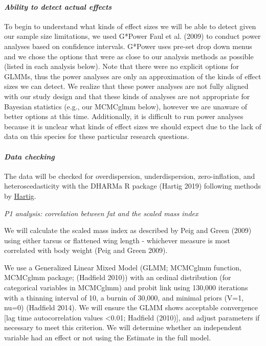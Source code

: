 \documentclass[
]{article}
\begin{document}
\hypertarget{ability-to-detect-actual-effects}{%
\paragraph{\texorpdfstring{\emph{Ability to detect actual
effects}}{Ability to detect actual effects}}\label{ability-to-detect-actual-effects}}

To begin to understand what kinds of effect sizes we will be able to
detect given our sample size limitations, we used G*Power Faul et al.
(2009) to conduct power analyses based on confidence intervals. G*Power
uses pre-set drop down menus and we chose the options that were as close
to our analysis methods as possible (listed in each analysis below).
Note that there were no explicit options for GLMMs, thus the power
analyses are only an approximation of the kinds of effect sizes we can
detect. We realize that these power analyses are not fully aligned with
our study design and that these kinds of analyses are not appropriate
for Bayesian statistics (e.g., our MCMCglmm below), however we are
unaware of better options at this time. Additionally, it is difficult to
run power analyses because it is unclear what kinds of effect sizes we
should expect due to the lack of data on this species for these
particular research questions.

\hypertarget{data-checking}{%
\paragraph{\texorpdfstring{\emph{Data
checking}}{Data checking}}\label{data-checking}}

The data will be checked for overdispersion, underdispersion,
zero-inflation, and heteroscedasticity with the DHARMa R package (Hartig
2019) following methods by
\href{https://cran.r-project.org/web/packages/DHARMa/vignettes/DHARMa.html}{Hartig}.

\emph{P1 analysis: correlation between fat and the scaled mass index}

We will calculate the scaled mass index as described by Peig and Green
(2009) using either tarsus or flattened wing length - whichever measure
is most correlated with body weight (Peig and Green 2009).

We use a Generalized Linear Mixed Model (GLMM; MCMCglmm function,
MCMCglmm package; (Hadfield 2010)) with an ordinal distribution (for
categorical variables in MCMCglmm) and probit link using 130,000
iterations with a thinning interval of 10, a burnin of 30,000, and
minimal priors (V=1, nu=0) (Hadfield 2014). We will ensure the GLMM
shows acceptable convergence {[}lag time autocorrelation values
\textless0.01; Hadfield (2010){]}, and adjust parameters if necessary to
meet this criterion. We will determine whether an independent variable
had an effect or not using the Estimate in the full model.
\end{document}
